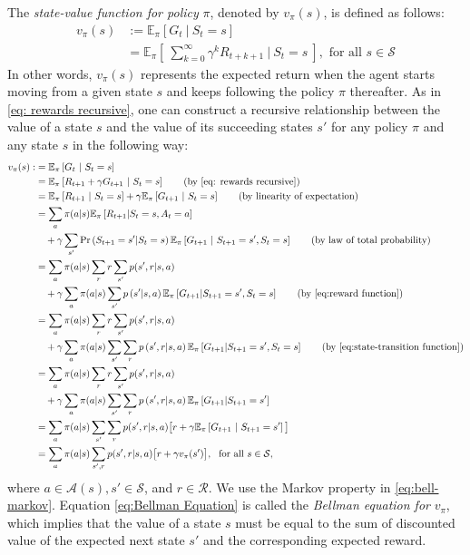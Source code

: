 The \textit{state-value function for policy} $\pi$, denoted by $v_\pi(s)$, is defined as follows:
\begin{align}
    v_\pi(s) &:= \mathbb{E}_\pi[G_t \ | \ S_t=s] \nonumber \\
    &= \mathbb{E}_\pi\left[ \ \sum_{k=0}^{\infty}\gamma^kR_{t+k+1} \ | \ S_t=s \ \right], \text{ for all } s\in\mathcal{S}
\end{align}
In other words, $v_\pi(s)$ represents the expected return when the agent starts moving from a given state $s$ and keeps following the policy $\pi$ thereafter.
\clearpage
As in \eqref{eq: rewards recursive}, one can construct a recursive relationship between the value of a state $s$ and the value of its succeeding states $s'$ for any policy $\pi$ and any state $s$ in the following way:
\begin{align}
    v_\pi(s) :&= \mathbb{E}_\pi\left[G_t \ | \ S_t = s\right]\nonumber\\
    &= \mathbb{E}_\pi\left[R_{t+1} + \gamma G_{t+1} \ | \ S_t = s\right]\tag{by \autoref{eq: rewards recursive}} \nonumber\\
    &= \mathbb{E}_\pi\left[R_{t+1} \ | \ S_t = s\right] + \gamma\mathbb{E}_\pi\left[G_{t+1} \ | \ S_t=s \right]\tag{by linearity of expectation}\nonumber\\
    &= \sum_a\pi(a|s)\mathbb{E}_\pi\left[R_{t+1}|S_t=s, A_t=a\right]\nonumber\\
    &\quad + \gamma\sum_{s'}\text{Pr}\left(S_{t+1}=s'|S_t = s\right)\mathbb{E}_\pi\left[G_{t+1} \ | \ S_{t+1} = s', S_t = s\right]\tag{by law of total probability}\nonumber\\
    &=\sum_a\pi(a|s)\sum_r r\sum_{s'}p(s',r|s,a)\nonumber\\
    &\quad+\gamma\sum_a\pi(a|s)\sum_{s'}p\left(s'|s, a \right)\mathbb{E}_\pi\left[G_{t+1}|S_{t+1}=s', S_t=s\right]\tag{by \autoref{eq:reward function}} \nonumber\\
    &=\sum_a\pi(a|s)\sum_r r\sum_{s'}p(s',r|s,a)\nonumber\\
    &\quad+\gamma\sum_a\pi(a|s)\sum_{s'}\sum_{r}p\left(s',r|s,a\right)\mathbb{E}_\pi\left[G_{t+1}|S_{t+1}=s', S_t=s\right]\tag{by \autoref{eq:state-transition function}} \nonumber\\
    &=\sum_a\pi(a|s)\sum_r r\sum_{s'}p(s',r|s,a)\nonumber\\
    &\quad+\gamma\sum_a\pi(a|s)\sum_{s'}\sum_{r}p\left(s',r|s,a\right)\mathbb{E}_\pi\left[G_{t+1}|S_{t+1}=s'\right]\label{eq:bell-markov}\\
    &= \sum_a\pi(a|s)\sum_{s'}\sum_r p(s',r|s,a)\big[ r+\gamma\mathbb{E}_\pi\left[ G_{t+1} \ | \ S_{t+1}=s'\right]\big]\nonumber\\
    &=\sum_a\pi(a|s)\sum_{s',r} p(s',r|s,a)\big[ r+\gamma v_\pi(s')\big], \ \text{ for all }s\in\mathcal{S},\label{eq:Bellman Equation}
\end{align}
where $a\in\mathcal{A}(s), s' \in \mathcal{S}$, and $r\in\mathcal{R}$. We use the Markov property in \eqref{eq:bell-markov}. Equation \eqref{eq:Bellman Equation} is called the \textit{Bellman equation for }$v_\pi$, which implies that the value of a state $s$ must be equal to the sum of discounted value of the expected next state $s'$ and the corresponding expected reward.

